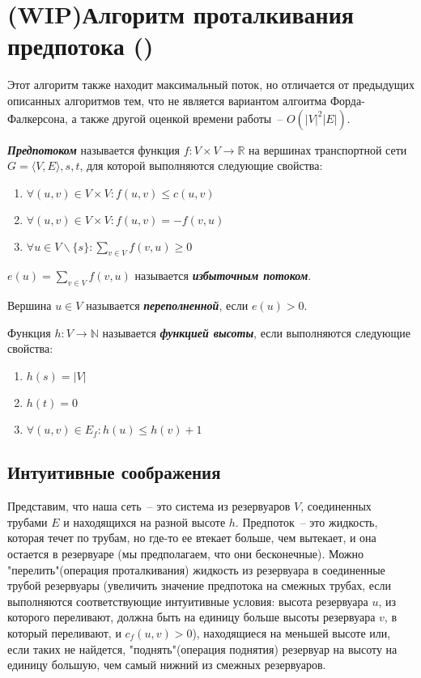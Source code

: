 \let\bf\bfseries
\let\it\itshape
\section{(WIP)Алгоритм проталкивания предпотока (\groth)}
Этот алгоритм также находит максимальный поток, но отличается от предыдущих описанных алгоритмов тем, что не является вариантом алгоитма Форда-Фалкерсона, а также другой оценкой времени работы~-- $O(|V|^2|E|)$.
\begin{definition}
	{\bf\it Предпотоком} называется функция $f\colon V\times V\to\mathbb{R}$ на вершинах транспортной сети $G=\langle V,E\rangle,s,t$, для которой выполняются следующие свойства:
	\begin{enumerate}
		\item $\forall(u,v)\in V\times V\colon f(u,v)\le c(u,v)$
		\item $\forall(u,v)\in V\times V\colon f(u,v)=-f(v,u)$
		\item $\forall u\in V\smallsetminus\{s\}\colon \sum_{v\in V} f(v,u)\ge0$
	\end{enumerate}
	$e(u)=\sum_{v\in V} f(v,u)$ называется {\bf\it избыточным потоком}.

	Вершина $u\in V$ называется {\bf\it переполненной}, если $e(u)>0$.
\end{definition}
\begin{definition}
	Функция $h\colon V\to\mathbb{N}$ называется {\bf\it функцией высоты}, если выполняются следующие свойства:
	\begin{enumerate}
		\item $h(s)=|V|$
		\item $h(t)=0$
		\item $\forall (u,v)\in E_f\colon h(u)\le h(v)+1$
	\end{enumerate}
\end{definition}
\subsection{Интуитивные соображения}
Представим, что наша сеть~-- это система из резервуаров $V$, соединенных трубами $E$ и находящихся на разной высоте $h$. Предпоток~-- это жидкость, которая течет по трубам, но где-то ее втекает больше, чем вытекает, и она остается в резервуаре (мы предполагаем, что они бесконечные). Можно "перелить"(операция проталкивания) жидкость из резервуара в соединенные трубой резервуары (увеличить значение предпотока на смежных трубах, если выполняются соответствующие интуитивные условия: высота резервуара $u$, из которого переливают, должна быть на единицу больше высоты резервуара $v$, в который переливают, и $c_f(u,v)>0$), находящиеся на меньшей высоте или, если таких не найдется, "поднять"(операция поднятия) резервуар на высоту на единицу большую, чем самый нижний из смежных резервуаров.
	
